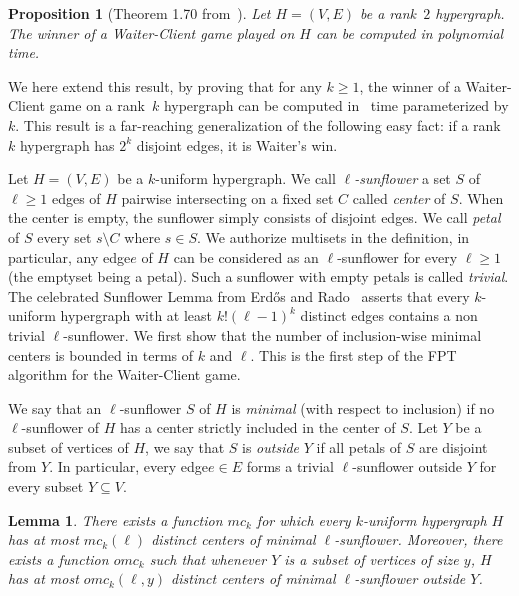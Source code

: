 \documentclass{article}
\newcommand{\hyp}{H}
\newcommand{\WS}{E}
\newcommand{\som}{V}
\newcommand{\hxf}{\hyp = (\som, \WS)}
\newcommand{\hedge}{edge\xspace}
\newcommand{\hedges}{edges\xspace}
\newtheorem{lemma}[theorem]{Lemma}
\newtheorem{proposition}[theorem]{Proposition}
\begin{document}
\begin{proposition}[Theorem 1.70 from~\cite{oij2024thesis}]\label{prop: rank 2 Waiter-Client}
    Let $\hxf$ be a rank~$2$ hypergraph. The winner of a Waiter-Client game played on $\hyp$ can be computed in polynomial time.
\end{proposition}

We here extend this result, by proving that for any $k \ge 1$, the winner of a Waiter-Client game on a rank~$k$ hypergraph can be computed in \FPT\ time parameterized by $k$. This result is a far-reaching generalization of the following easy fact: if a rank~$k$ hypergraph has $2^k$ disjoint \hedges, it is Waiter's win.

Let $H=(V,E)$ be a $k$-uniform hypergraph. We call \emph{$\ell$-sunflower} a set $S$ of $\ell \geq 1$ \hedges of $H$ pairwise intersecting on a fixed set $C$ called \emph{center} of $S$. When the center is empty, the sunflower simply consists of disjoint \hedges. We call \emph{petal} of $S$ every set $s\setminus C$ where $s\in S$.
We authorize multisets in the definition, in particular, any \hedge $e$ of $H$ can be considered as an $\ell$-sunflower for every $\ell\geq 1$ (the emptyset being a petal). Such a sunflower with empty petals is called \emph{trivial}. The celebrated Sunflower Lemma from Erd\H{o}s and Rado~\cite{ER60} asserts that every $k$-uniform hypergraph with at least $k!(\ell-1)^k$ distinct \hedges contains a non trivial $\ell$-sunflower. We first show that the number of inclusion-wise minimal centers is bounded in terms of $k$ and $\ell$. This is the first step of the FPT algorithm for the Waiter-Client game.

We say that an $\ell$-sunflower $S$ of $H$ is \emph{minimal} (with respect to inclusion) if 
no $\ell$-sunflower of $H$ has a center strictly included in the center of $S$. Let $Y$ be a subset of vertices of $H$, we say that $S$ is \emph{outside} $Y$ if all petals of $S$ are disjoint from $Y$. In particular, every \hedge \(e \in E\) forms a trivial \(\ell\)-sunflower outside \(Y\) for every subset \(Y \subseteq V\).

\begin{lemma}\label{lem:minsun}
There exists a function $mc_k$ for which every $k$-uniform hypergraph $H$ has at most $mc_k(\ell)$ distinct centers of minimal $\ell$-sunflower. Moreover, there exists a function $omc_k$ such that whenever $Y$ is a subset of vertices of size $y$, $H$ has at most $omc_k(\ell,y)$ distinct centers of minimal $\ell$-sunflower outside $Y$.
\end{lemma}
\end{document}
